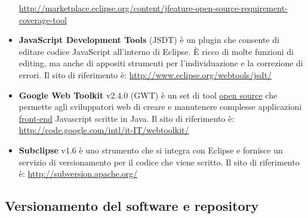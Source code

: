 \documentclass[a4paper,11pt]{article}
\begin{document}
\begin{itemize}
\url{http://marketplace.eclipse.org/content/jfeature-open-source-requirement-coverage-tool}
\newpage
\item \textbf{JavaScript Development Tools} (JSDT) \`e un plugin che consente di editare codice JavaScript all'interno di Eclipse. \`E ricco di molte funzioni di editing, ma anche di appositi strumenti per l'individuazione e la correzione di errori. Il sito di riferimento \`e:
\url{http://www.eclipse.org/webtools/jsdt/}
\item \textbf{Google Web Toolkit} v2.4.0 (GWT) \`e un set di tool \underline{open source} che permette agli sviluppatori web di creare e manutenere complesse applicazioni \underline{front-end} Javascript scritte in Java. Il sito di riferimento \`e:
\url{http://code.google.com/intl/it-IT/webtoolkit/}
\item \textbf{Subclipse} v1.6 \`e uno strumento che si integra con Eclipse e fornisce un servizio di versionamento per il codice che viene scritto. Il sito di riferimento \`e:
\url{http://subversion.apache.org/}
\end{itemize} 
\subsection{Versionamento del software e repository}
\end{document}
